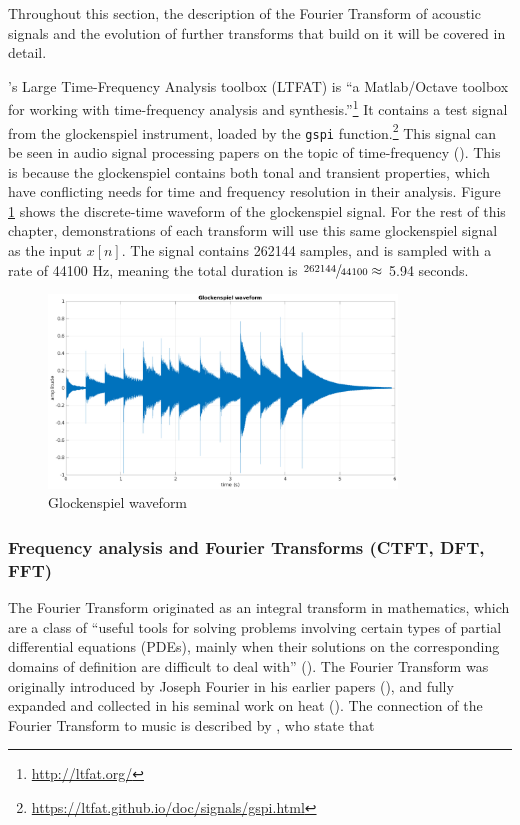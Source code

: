 \documentclass[report.tex]{subfiles}
\begin{document}
Throughout this section, the description of the Fourier Transform of acoustic signals and the evolution of further transforms that build on it will be covered in detail.

\textcite{ltfat}'s Large Time-Frequency Analysis toolbox (LTFAT) is ``a Matlab/Octave toolbox for working with time-frequency analysis and synthesis.''\footnote{\url{http://ltfat.org/}} It contains a test signal from the glockenspiel instrument, loaded by the \Verb#gspi# function.\footnote{\url{https://ltfat.github.io/doc/signals/gspi.html}} This signal can be seen in audio signal processing papers on the topic of time-frequency (\cite{doerflerphd, balazs, jaillet, tfjigsaw, invertiblecqt, wmdct}). This is because the glockenspiel contains both tonal and transient properties, which have conflicting needs for time and frequency resolution in their analysis. Figure \ref{fig:glockwaveform} shows the discrete-time waveform of the glockenspiel signal. For the rest of this chapter, demonstrations of each transform will use this same glockenspiel signal as the input $x[n]$. The signal contains 262144 samples, and is sampled with a rate of 44100 Hz, meaning the total duration is $\sfrac{262144}{44100} \approx$ 5.94 seconds.

\begin{figure}[ht]
	\centering
	\includegraphics[width=0.825\textwidth]{./images-gspi/gspi_time_domain.png}
	\caption{Glockenspiel waveform}
	\label{fig:glockwaveform}
\end{figure}

\newpagefill

\subsubsection{Frequency analysis and Fourier Transforms (CTFT, DFT, FFT)}
\label{sec:freqanal}

The Fourier Transform originated as an integral transform in mathematics, which are a class of ``useful tools for solving problems involving certain types of partial differential equations (PDEs), mainly when their solutions on the corresponding domains of definition are difficult to deal with'' (\cite{fourierhistory}). The Fourier Transform was originally introduced by Joseph Fourier in his earlier papers (\cite{fourierhist1, fourierhist2}), and fully expanded and collected in his seminal work on heat (\cite{fourierheat}). The connection of the Fourier Transform to music is described by \textcite{fouriermusic}, who state that
\end{document}
